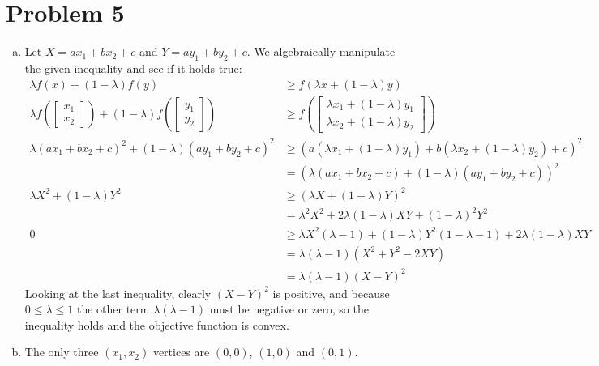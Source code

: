 \documentclass[11pt]{article}
\begin{document}
\newpage
\section*{Problem 5}
\begin{enumerate}[(a)]
\item Let $X=ax_1+bx_2+c$ and $Y=ay_1+by_2+c$. We algebraically manipulate the given inequality and see if it holds true:
\begin{align*}
\lambda f(x)+(1-\lambda)f(y) &\geq f(\lambda x+(1-\lambda)y) \\
\lambda f(\begin{bmatrix}x_1\\x_2\end{bmatrix})+(1-\lambda)f(\begin{bmatrix}y_1\\y_2\end{bmatrix}) &\geq f(\begin{bmatrix}\lambda x_1+(1-\lambda)y_1\\\lambda x_2+(1-\lambda)y_2\end{bmatrix}) \\
\lambda(ax_1+bx_2+c)^2+(1-\lambda)(ay_1+by_2+c)^2 &\geq (a(\lambda x_1+(1-\lambda)y_1)+b(\lambda x_2+(1-\lambda)y_2)+c)^2 \\
&= (\lambda(ax_1+bx_2+c)+(1-\lambda)(ay_1+by_2+c))^2 \\
\lambda X^2+(1-\lambda)Y^2 &\geq (\lambda X+(1-\lambda)Y)^2 \\
&= \lambda^2X^2+2\lambda(1-\lambda)XY+(1-\lambda)^2Y^2 \\
0 &\geq \lambda X^2(\lambda-1)+(1-\lambda)Y^2(1-\lambda-1)+2\lambda(1-\lambda)XY \\
&= \lambda(\lambda-1)(X^2+Y^2-2XY) \\
&= \lambda(\lambda-1)(X-Y)^2
\end{align*}
Looking at the last inequality, clearly $(X-Y)^2$ is positive, and because $0\leq\lambda\leq 1$ the other term $\lambda(\lambda-1)$ must be negative or zero, so the inequality holds and the objective function is convex.
\item The only three $(x_1,x_2)$ vertices are $(0,0)$, $(1,0)$ and $(0,1)$.
\end{enumerate}
\end{document}
